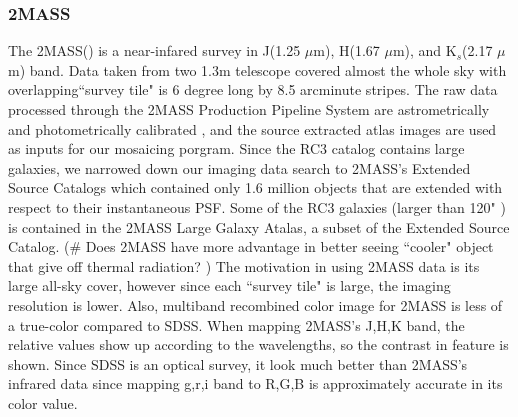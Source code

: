 \documentclass[5p]{elsarticle}
\begin{document}
	\subsubsection{2MASS}
	 The 2MASS(\citet{2mass}) is a near-infared survey in J(1.25 $\mu$m), H(1.67 $\mu$m), and K$_s$(2.17 $\mu$m) band. Data taken from two 1.3m telescope covered almost the whole sky with  overlapping``survey tile" is 6 degree long by 8.5 arcminute stripes.%
 The raw data processed through the 2MASS Production Pipeline System are astrometrically and photometrically calibrated , and the source extracted atlas images are used as inputs for our mosaicing porgram. Since the RC3 catalog contains large galaxies, we narrowed down our imaging data search to  2MASS's Extended Source Catalogs which contained only 1.6 million objects that are extended with respect to their instantaneous PSF. %
Some of the RC3 galaxies (larger than 120" ) is contained in the 2MASS Large Galaxy Atalas, a subset of the Extended Source Catalog.	(\# Does 2MASS have more advantage in better seeing ``cooler" object that give off thermal radiation? ) The motivation in using 2MASS data is its large all-sky cover, however since each ``survey tile" is large, the imaging resolution is lower.  Also, multiband recombined color image for 2MASS is less of a true-color compared to SDSS. When mapping 2MASS's J,H,K band, the relative values show up according to the wavelengths, so the contrast in feature is shown. Since  SDSS is an optical survey, it look much better than 2MASS's infrared data since mapping g,r,i band to R,G,B is approximately accurate in its color value. 
\end{document}
